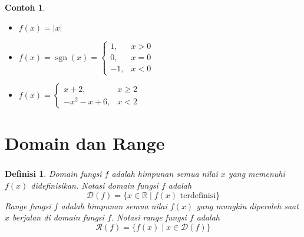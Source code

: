 \documentclass[aspectratio=169]{beamer}
\DeclareMathOperator{\sign}{sgn}
\newtheorem{definisi}{Definisi}
\theoremstyle{definition}
\newtheorem*{contoh}{Contoh}
\newcommand{\R}{\mathbb{R}}
\newcommand{\dom}{\mathcal{D}}
\newcommand{\rng}{\mathcal{R}}
\begin{document}
\begin{frame}
    \frametitle{\insertsection}
    \begin{contoh}
        \begin{itemize}[label=$\checkmark$]
            \item $f(x)=|x|$
            \item $f(x)=\sign(x)=\begin{cases}
                          1,  & x>0 \\
                          0,  & x=0 \\
                          -1, & x<0
                      \end{cases}$
            \item $f(x)=\begin{cases}
                          x+2,      & x\geq 2 \\
                          -x^2-x+6, & x<2
                      \end{cases}$
        \end{itemize}
    \end{contoh}
\end{frame}

\section{Domain dan Range}
\begin{frame}
    \frametitle{\insertsection}
    \begin{definisi}
        Domain fungsi $f$ adalah himpunan semua nilai $x$ yang memenuhi $f(x)$ didefinisikan. Notasi domain fungsi $f$ adalah \[\dom(f)=\{x\in\R\mid f(x)\text{ terdefinisi}\}\]
        Range fungsi $f$ adalah himpunan semua nilai $f(x)$ yang mungkin diperoleh saat $x$ berjalan di domain fungsi $f$. Notasi range fungsi $f$ adalah \[\rng(f)=\{f(x)\mid x\in\dom(f)\}\]
    \end{definisi}
\end{frame}
\end{document}
